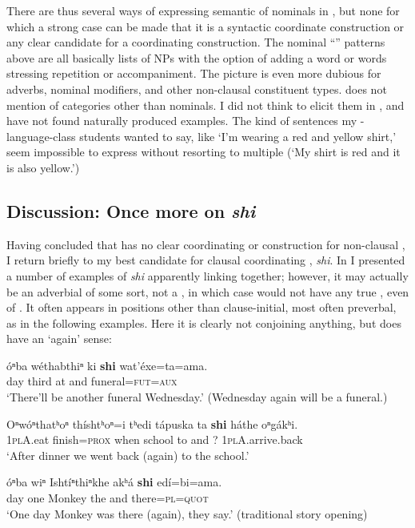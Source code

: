 \documentclass[output=paper]{LSP/langsci}
\begin{document}
There are thus several ways of expressing semantic  of nominals in , but none for which a strong case can be made that it is a syntactic coordinate construction or any clear candidate for a coordinating construction. The nominal ``'' patterns above are all basically lists of NPs with the option of adding a word or words stressing repetition or accompaniment. The picture is even more dubious for adverbs, nominal modifiers, and other non-clausal constituent types. \citet{Koontz1984} does not mention  of categories other than nominals. I did not think to elicit them in , and have not found naturally produced examples.  The kind of sentences my -language-class students wanted to say, like `I'm wearing a red and yellow shirt,' seem impossible to express without resorting to multiple  (`My shirt is red and it is also yellow.')

\subsection{Discussion: Once more on \textit{shi}}

Having concluded that  has no clear coordinating  or  construction for non-clausal , I return briefly to my best candidate for clausal coordinating , \textit{shi}. In  I presented a number of examples of \textit{shi} apparently linking  together; however, it may actually be an adverbial of some sort, not a , in which case  would not have any true , even of . It often appears in positions other than clause-initial, most often preverbal, as in the following examples. Here it is clearly not conjoining anything, but does have an `again' sense:  

\begin{exe}	
\ex\label{ex:rudin:32}
\gll óⁿba 	wéthabthiⁿ 	ki 	\textbf{shi}  	wat'éxe=ta=ama.  \\
day  	third          	at 	and 	funeral=\textsc{fut=aux}  \\
\trans `There'll be another funeral Wednesday.'   (Wednesday again will be a funeral.)

\ex\label{ex:rudin:33} 
\gll Oⁿwóⁿthatʰoⁿ thíshtʰoⁿ=i 	tʰedi 	tápuska 	ta 	\textbf{shi}  háthe 	oⁿgákʰi. \\
\textsc{1plA}.eat  	finish=\textsc{prox} 	when 	school 	to 	and ?  	\textsc{1plA}.arrive.back \\
\trans `After dinner we went back (again) to the school.'

\ex\label{ex:rudin:34}
\gll óⁿba 	wiⁿ 	Ishtíⁿthiⁿkhe 	akʰá \textbf{shi} edí=bi=ama. \\
day	one 	Monkey 	the 	and 	there=\textsc{pl=quot} \\
\trans `One day Monkey was there (again), they say.'  (traditional story opening)
\end{exe}
\end{document}
